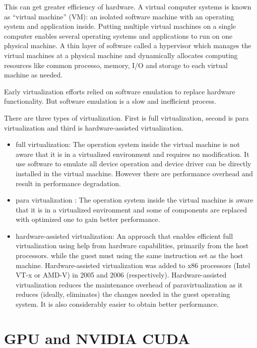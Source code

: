 This can get greater efficiency of hardware. A virtual computer systems is known as
“virtual machine” (VM): an isolated software machine with an operating system and application
inside. Putting multiple virtual machines on a single computer enables several operating systems and
applications to run on one physical machine. A thin layer of software called a hypervisor which
manages the virtual machines at a physical machine and dynamically allocates computing resources like common processo, memory, I/O and storage to
each virtual machine as needed. 

Early virtualization efforts relied on software emulation to replace hardware functionality. But
software emulation is a slow and inefficient process.

There are three types of virtualization. First is full virtualization, second is para virtualization and third is hardware-assisted virtualization.

\begin{itemize}
    \item full virtualization: The operation system inside the virtual machine  is not aware that it is in a virtualized environment and requires no modification. 
        It use software to emulate all device operation and device driver can be directly installed in the virtual machine. However there are performance overhead and result in performance degradation.
    \item para virtualization : The operation system inside the virtual machine is aware that it is in a virtualized environment and 
        some of components are replaced with optimized one to gain better performance.
    \item hardware-assisted virtualization: An approach  that enables efficient full virtualization using help from hardware capabilities, primarily from the host processors. 
        while the guest must using the same instruction set as the host machine. Hardware-assisted virtualization was added to x86 processors (Intel VT-x or AMD-V) in 2005 and 2006 (respectively).
        Hardware-assisted virtualization reduces the maintenance overhead of paravirtualization as it reduces (ideally, eliminates) the changes needed in the guest operating system. It is also considerably easier to obtain better performance.
\end{itemize}

\section{GPU and NVIDIA CUDA}

